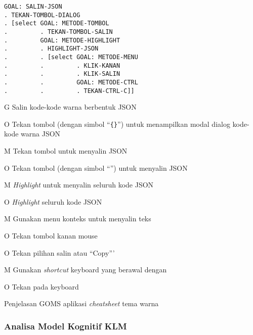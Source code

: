 \begin{verbatim}
GOAL: SALIN-JSON
. TEKAN-TOMBOL-DIALOG
. [select GOAL: METODE-TOMBOL
.         . TEKAN-TOMBOL-SALIN
.         GOAL: METODE-HIGHLIGHT
.         . HIGHLIGHT-JSON
.         . [select GOAL: METODE-MENU
.         .         . KLIK-KANAN
.         .         . KLIK-SALIN
.         .         GOAL: METODE-CTRL
.         .         . TEKAN-CTRL-C]]
\end{verbatim}

\begin{chtbl}
  \begin{gomstbl}
    G{
      Salin kode-kode warna berbentuk JSON
    }

    O{
      Tekan tombol (dengan simbol ``\verb`{}`'') untuk menampilkan
      modal dialog kode-kode warna JSON
    }

    M{
      Tekan tombol untuk menyalin JSON
    }

    O{
      Tekan tombol (dengan simbol ``\faCopy[regular]'') untuk menyalin JSON
    }

    M{
      \textit{Highlight} untuk menyalin seluruh kode JSON
    }

    O{
      \textit{Highlight} seluruh kode JSON
    }

    M{
      Gunakan menu konteks untuk menyalin teks
    }

    O{
      Tekan tombol kanan mouse
    }

    O{
      Tekan pilihan salin atau ``Copy'''
    }

    M{
      Gunakan \textit{shortcut} keyboard yang berawal dengan \Ctrl
    }

    O{
      Tekan \Ctrl{+} pada keyboard
    }
  \end{gomstbl}
  \caption{Penjelasan GOMS aplikasi \textit{cheatsheet} tema warna}
\end{chtbl}

\clearpage
\subsubsection{Analisa Model Kognitif KLM}

